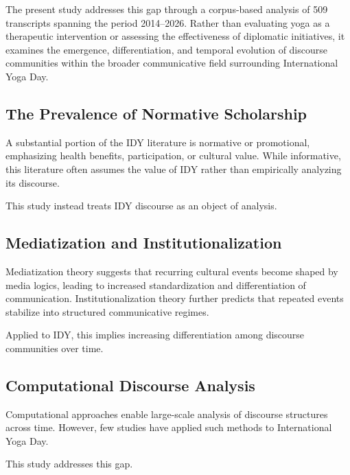 \documentclass[11pt]{article}
\begin{document}
The present study addresses this gap through a corpus-based analysis of 509 transcripts spanning the period 2014--2026.
Rather than evaluating yoga as a therapeutic intervention or assessing the effectiveness of diplomatic initiatives, it
examines the emergence, differentiation, and temporal evolution of discourse communities within the broader
communicative field surrounding International Yoga Day.




\subsection{The Prevalence of Normative Scholarship}



A substantial portion of the IDY literature is normative or promotional, emphasizing health benefits, participation, or
cultural value. While informative, this literature often assumes the value of IDY rather than empirically analyzing its
discourse.


This study instead treats IDY discourse as an object of analysis.



\subsection{Mediatization and Institutionalization}



Mediatization theory suggests that recurring cultural events become shaped by media logics, leading to increased
standardization and differentiation of communication. Institutionalization theory further predicts that repeated events
stabilize into structured communicative regimes.


Applied to IDY, this implies increasing differentiation among discourse communities over time.



\subsection{Computational Discourse Analysis}



Computational approaches enable large-scale analysis of discourse structures across time. However, few studies have applied such methods to International Yoga Day.



This study addresses this gap.
\end{document}
